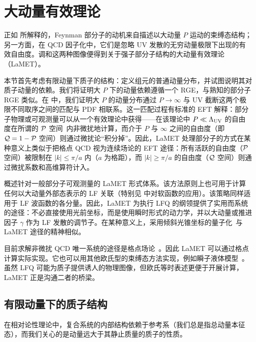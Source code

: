 \section{大动量有效理论}
\label{sec:lamet}
正如  所解释的，Feynman 部分子的动机来自描述以大动量 $P$ 运动的束缚态结构；另一方面，在 QCD 因子化中，它们是忽略 UV 发散的无穷动量极限下出现的有效自由度。调和这两种图像便得到关于强子部分子结构的大动量有效理论（LaMET）。

本节首先考虑有限动量下质子的结构：定义组元的普通动量分布，并试图说明其对质子动量的依赖。我们将证明大 $P$ 下的动量依赖遵循一个 RGE，与熟知的部分子 RGE 类似。在  中，我们证明大 $P$ 的动量分布通过 $P\to \infty$ 与 UV 截断这两个极限不同取序之间的匹配与 PDF 相联系。这一匹配过程有标准的 EFT 解释：部分子物理或可观测量可以从一个有效理论中获得——在该理论中 $P\ll \Lambda_{\rm UV}$ 的自由度在所谓的 ${\cal P}$ 空间~\cite{Messiah:1979eg}内非微扰地计算，而介于 $P$ 与 $\infty$ 之间的自由度（即 ${\cal Q}=1-{\cal P}$ 空间）则通过微扰论``积分掉''。因此，LaMET 处理部分子的方式在某种意义上类似于把格点 QCD 视为连续场论的 EFT 途径：所有活跃的自由度（${\cal P}$ 空间）被限制在 $|k| \le \pi/a$ 内（$a$ 为格距），而 $|k| \ge \pi/a$ 的自由度（${\cal Q}$ 空间）则通过微扰系数和高维算符计入。

 概述针对一般部分子可观测量的 LaMET 形式体系。该方法原则上也可用于计算任何以大动量外部态表示的 LF 关联（特别见  中对软函数的应用）。该策略同样适用于 LF 波函数的各分量。因此，LaMET 为执行 LFQ 的纲领提供了实用而系统的途径：不必直接使用光前坐标，而是使用瞬时形式的动力学，并以大动量或推进因子 $\gamma$ 作为 LF 发散的调节子。在某种意义上，采用倾斜光锥坐标的量子化~\cite{Lenz:1991sa}与 LaMET 途径的精神相似。

目前求解非微扰 QCD 唯一系统的途径是格点场论~\cite{Wilson:1974sk}。因此 LaMET 可以通过格点计算实际实现。它也可以用其他欧氏型的束缚态方法实现，例如瞬子液体模型~\cite{Schafer:1996wv}。虽然 LFQ 可能为质子提供诱人的物理图像，但欧氏等时表述更便于开展计算，LaMET 正是沟通二者的桥梁。

\subsection{有限动量下的质子结构}
\label{sec:lamet-frame}
在相对论性理论中，复合系统的内部结构依赖于参考系（我们总是指总动量本征态），而我们关心的是动量远大于其静止质量的质子的性质。

